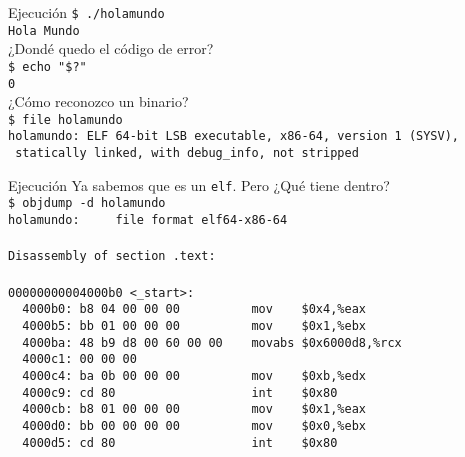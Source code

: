 \documentclass[aspectratio=169]{beamer}
\begin{document}
\begin{frame}[fragile,t]{Ejecución}
    \small
    \vspace{0.2cm}
        \verb|$ ./holamundo|\\
        \pause
        \vspace{0.2cm}
        \verb|Hola Mundo|\\
        \pause
    \vspace{0.7cm}
        \textcolor{verdeuca}{¿Dondé quedo el código de error?}\\
        \pause
        \vspace{0.2cm}
        \verb|$ echo "$?"|\\
        \pause
        \vspace{0.2cm}
        \verb|0|\\
        \pause
    \vspace{0.7cm}
        \textcolor{verdeuca}{¿Cómo reconozco un binario?}\\
        \pause
        \vspace{0.2cm}
        \verb|$ file holamundo|\\
        \pause
        \vspace{0.2cm}
        \verb|holamundo: ELF 64-bit LSB executable, x86-64, version 1 (SYSV),|\\
        \verb| statically linked, with debug_info, not stripped|\\
\end{frame}

\begin{frame}[fragile,t]{Ejecución}
    \small
    \textcolor{verdeuca}{Ya sabemos que es un \texttt{elf}. Pero ¿Qué tiene dentro?}\\
    \pause
    \vspace{0.2cm}
    \verb|$ objdump -d holamundo|\\
    \vspace{0.2cm}
    \pause
    \verb|holamundo:     file format elf64-x86-64|\\
    \verb||\\
    \verb|Disassembly of section .text:|\\
    \verb||\\
    \verb|00000000004000b0 <_start>:|\\
    \verb|  4000b0:	b8 04 00 00 00       	mov    $0x4,%eax|\\
    \verb|  4000b5:	bb 01 00 00 00       	mov    $0x1,%ebx|\\
    \verb|  4000ba:	48 b9 d8 00 60 00 00 	movabs $0x6000d8,%rcx|\\
    \verb|  4000c1:	00 00 00 |\\
    \verb|  4000c4:	ba 0b 00 00 00       	mov    $0xb,%edx|\\
    \verb|  4000c9:	cd 80                	int    $0x80|\\
    \verb|  4000cb:	b8 01 00 00 00       	mov    $0x1,%eax|\\
    \verb|  4000d0:	bb 00 00 00 00       	mov    $0x0,%ebx|\\
    \verb|  4000d5:	cd 80                	int    $0x80|\\
\end{frame}
\end{document}
